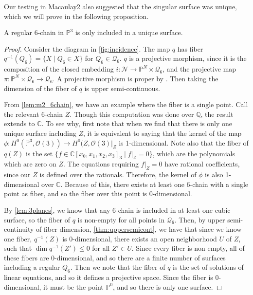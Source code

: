 Our testing in Macaulay2 also suggested that the singular surface was unique, which we will prove in the following proposition.

\begin{proposition}\label{prop:unique}
    A regular 6-chain in $\mathbb{P}^3$ is only included in a unique surface.
\end{proposition}
\begin{proof}
    Consider the diagram in \cref{fig:incidence}. The map $q$ has fiber $q^{-1}(Q_6) = \{X \mid Q_6 \in X\}$ for $Q_6 \in \mathcal{Q}_6$. $q$ is a projective morphism, since it is the composition of the closed embedding $i \colon \mathcal{N} \to \mathbb{P}^N \times \mathcal{Q}_6$, and the projective map $\pi \colon \mathbb{P}^N \times \mathcal{Q}_6 \to \mathcal{Q}_6$. A projective morphism is proper by \cite[Theorem II.4.9]{Ha77}. Then taking the dimension of the fiber of $q$ is upper semi-continuous. 

    From \cref{lem:m2_6chain}, we have an example where the fiber is a single point. Call the relevant 6-chain $Z$. Though this computation was done over $\mathbb{Q}$, the result extends to $\mathbb{C}$. To see why, first note that when we find that there is only one unique surface including $Z$, it is equivalent to saying that the kernel of the map $\phi \colon H^0(\mathbb{P}^3, \mathcal{O}(3)) \rightarrow H^0(Z, \mathcal{O}(3)|_{Z}$ is 1-dimensional. Note also that the fiber of $q(Z)$ is the set $\{f \in \mathbb{C}[x_0,x_1,x_2,x_3]_3 \mid f|_{Z} = 0\}$, which are the polynomials which are zero on $Z$. The equations requiring $f|_{Z} = 0$ have rational coefficients, since our $Z$ is defined over the rationals. Therefore, the kernel of $\phi$ is also 1-dimensional over $\mathbb{C}$. Because of this, there exists at least one 6-chain with a single point as fiber, and so the fiber over this point is 0-dimensional.

    By \cref{lem:3planes}, we know that any 6-chain is included in at least one cubic surface, so the fiber of $q$ is non-empty for all points in $\mathcal{Q}_6$. Then, by upper semi-continuity of fiber dimension, \cref{thm:uppersemicont}, we have that since we know one fiber, $q^{-1}(Z)$ is 0-dimensional, there exists an open neighborhood $U$ of $Z$, such that $\dim q^{-1}(Z') \leq 0$ for all $Z' \in U$. Since every fiber is non-empty, all of these fibers are 0-dimensional, and so there are a finite number of surfaces including a regular $Q_6$. Then we note that the fiber of $q$ is the set of solutions of linear equations, and so it defines a projective space. Since the fiber is 0-dimensional, it must be the point $\mathbb{P}^0$, and so there is only one surface. 
\end{proof}
